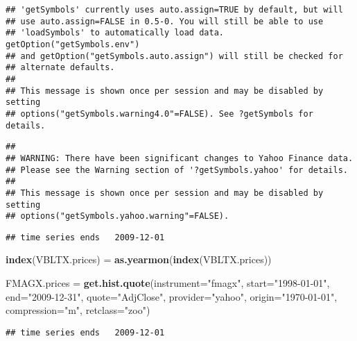 \documentclass[]{article}
\newenvironment{Shaded}{\begin{snugshade}}{\end{snugshade}}
\newcommand{\KeywordTok}[1]{\textcolor[rgb]{0.13,0.29,0.53}{\textbf{#1}}}
\newcommand{\DataTypeTok}[1]{\textcolor[rgb]{0.13,0.29,0.53}{#1}}
\newcommand{\StringTok}[1]{\textcolor[rgb]{0.31,0.60,0.02}{#1}}
\newcommand{\NormalTok}[1]{#1}
\begin{document}
\begin{verbatim}
## 'getSymbols' currently uses auto.assign=TRUE by default, but will
## use auto.assign=FALSE in 0.5-0. You will still be able to use
## 'loadSymbols' to automatically load data. getOption("getSymbols.env")
## and getOption("getSymbols.auto.assign") will still be checked for
## alternate defaults.
## 
## This message is shown once per session and may be disabled by setting 
## options("getSymbols.warning4.0"=FALSE). See ?getSymbols for details.
\end{verbatim}

\begin{verbatim}
## 
## WARNING: There have been significant changes to Yahoo Finance data.
## Please see the Warning section of '?getSymbols.yahoo' for details.
## 
## This message is shown once per session and may be disabled by setting
## options("getSymbols.yahoo.warning"=FALSE).
\end{verbatim}

\begin{verbatim}
## time series ends   2009-12-01
\end{verbatim}

\begin{Shaded}
\begin{Highlighting}[]
\KeywordTok{index}\NormalTok{(VBLTX.prices) =}\StringTok{ }\KeywordTok{as.yearmon}\NormalTok{(}\KeywordTok{index}\NormalTok{(VBLTX.prices))}

\NormalTok{FMAGX.prices =}\StringTok{ }\KeywordTok{get.hist.quote}\NormalTok{(}\DataTypeTok{instrument=}\StringTok{"fmagx"}\NormalTok{, }\DataTypeTok{start=}\StringTok{"1998-01-01"}\NormalTok{,}
                             \DataTypeTok{end=}\StringTok{"2009-12-31"}\NormalTok{, }\DataTypeTok{quote=}\StringTok{"AdjClose"}\NormalTok{,}
                             \DataTypeTok{provider=}\StringTok{"yahoo"}\NormalTok{, }\DataTypeTok{origin=}\StringTok{"1970-01-01"}\NormalTok{,}
                             \DataTypeTok{compression=}\StringTok{"m"}\NormalTok{, }\DataTypeTok{retclass=}\StringTok{"zoo"}\NormalTok{)}
\end{Highlighting}
\end{Shaded}

\begin{verbatim}
## time series ends   2009-12-01
\end{verbatim}
\end{document}
